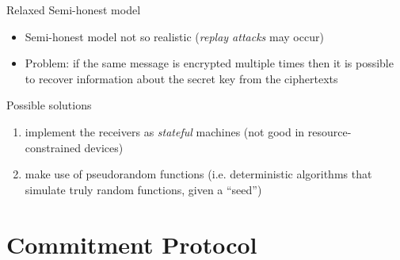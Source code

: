 \begin{frame}
  \begin{block}{Relaxed Semi-honest model}
   \begin{itemize}
    \item Semi-honest model not so realistic (\emph{replay attacks} may occur)
    \item \alert{Problem:} if the same message is encrypted multiple times then it is possible to recover information about the secret key from the ciphertexts\\
   \end{itemize}
  \end{block}

 \begin{block}{Possible solutions}
    \begin{enumerate}
     \item implement the receivers as \emph{stateful} machines (not good in resource-constrained devices)
     \item make use of pseudorandom functions (i.e. deterministic algorithms that simulate truly random functions, given a ``seed'')
    \end{enumerate}
 \end{block}
 
\end{frame}

\section{Commitment Protocol}

